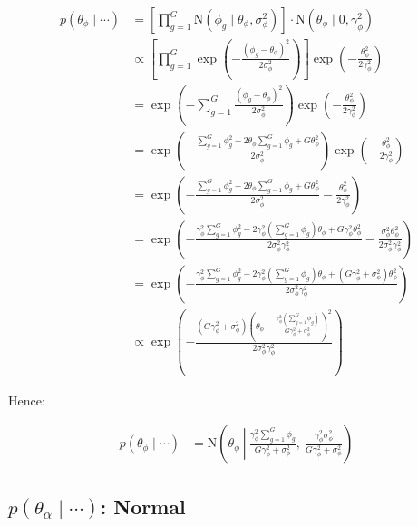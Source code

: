 \documentclass{article}\usepackage{graphicx, color}
\begin{document}
\begin{flushleft}
\begin{align*}
p(\theta_\phi \mid \cdots ) & = \left [ \prod_{g = 1}^G \text{N}( \phi_g \mid \theta_\phi, \sigma_\phi^2) \right] \cdot \text{N}(\theta_\phi \mid 0, \gamma_{\phi}^2) \\
&\propto \left [ \prod_{g = 1}^G \exp \left ( -\frac{(\phi_g - \theta_\phi)^2}{2 \sigma_\phi^2} \right) \right ] \exp \left ( - \frac{\theta_\phi^2}{2 \gamma_\phi^2} \right ) \\
&=  \exp \left ( - \sum_{g = 1}^G \frac{(\phi_g - \theta_\phi)^2}{2 \sigma_\phi^2} \right)  \exp \left ( - \frac{\theta_\phi^2}{2 \gamma_\phi^2} \right ) \\
&=  \exp \left ( -  \frac{\sum_{g = 1}^G\phi_g^2 -2  \theta_\phi \sum_{g = 1}^G \phi_g + G \theta_\phi^2}{2 \sigma_\phi^2} \right)  \exp \left ( - \frac{\theta_\phi^2}{2 \gamma_\phi^2} \right ) \\
&= \exp \left ( -  \frac{\sum_{g = 1}^G\phi_g^2 -2  \theta_\phi \sum_{g = 1}^G \phi_g + G \theta_\phi^2}{2 \sigma_\phi^2}  - \frac{\theta_\phi^2}{2 \gamma_\phi^2} \right ) \\
&= \exp \left ( -  \frac{ \gamma_\phi^2 \sum_{g = 1}^G \phi_g^2 -2  \gamma_\phi^2 (\sum_{g = 1}^G \phi_g) \theta_\phi + G \gamma_\phi^2 \theta_\phi^2}{2 \sigma_\phi^2 \gamma_\phi^2}  - \frac{\sigma_\phi^2 \theta_\phi^2}{2 \sigma_\phi^2 \gamma_\phi^2} \right ) \\
&= \exp \left ( -  \frac{ \gamma_\phi^2 \sum_{g = 1}^G \phi_g^2 -2  \gamma_\phi^2 (\sum_{g = 1}^G \phi_g) \theta_\phi + (G \gamma_\phi^2 + \sigma_\phi^2)\theta_\phi^2}{2 \sigma_\phi^2 \gamma_\phi^2} \right ) \\
&\propto \exp \left ( -  \frac{ (G \gamma_\phi^2 + \sigma_\phi^2) \left (\theta_\phi - \frac{\gamma_\phi^2  (\sum_{g = 1}^G \phi_g)}{G \gamma_\phi^2 + \sigma_\phi^2} \right )^2}{2 \sigma_\phi^2 \gamma_\phi^2} \right ) 
\end{align*}

Hence:

\begin{align*}
p(\theta_\phi \mid \cdots) &= \text{N} \left ( \theta_\phi \ \left | \ \frac{ \gamma_\phi^2 \sum_{g = 1}^G \phi_g}{G \gamma_\phi^2 + \sigma_\phi^2}, \ \frac{\gamma_\phi^2 \sigma_\phi^2}{G\gamma_\phi^2 + \sigma_\phi^2} \right . \right )
\end{align*}

\subsection{$p \left (\theta_\alpha \mid \cdots \right )$: Normal}


\end{flushleft}
\end{document}
